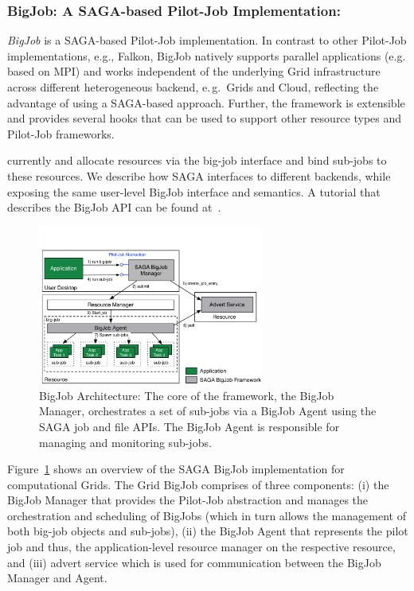     \subsubsection{BigJob: A SAGA-based Pilot-Job Implementation:}

    \emph{BigJob} is a SAGA-based Pilot-Job implementation. In contrast
    to other Pilot-Job implementations, e.g., Falkon, BigJob natively
    supports parallel applications (e.g. based on MPI) and works
    independent of the underlying Grid infrastructure across different
    heterogeneous backend, e.\,g.\ Grids and Cloud, reflecting the
    advantage of using a SAGA-based approach. Further, the framework is
    extensible and provides several hooks that can be used to support
    other resource types and Pilot-Job frameworks.

    currently %
    and %
    allocate resources via the big-job interface and bind sub-jobs to
    these resources.  We describe how SAGA interfaces to different
    backends, while exposing the same user-level BigJob interface and
    semantics.  A tutorial that describes the BigJob API can be found
    at~\cite{bigjob_cloud_tutorial}.

\begin{figure}[ht]
    \centering
    \includegraphics[width=0.66\textwidth]{figures/bigjob}
    \caption{BigJob Architecture: The core of the framework, the
      BigJob Manager, orchestrates a set of sub-jobs via a BigJob
      Agent using the SAGA job and file APIs.  The BigJob Agent is
      responsible for managing and monitoring sub-jobs.\up}
   \label{fig:figures_bigjob}
\end{figure}

    \vspace{0.1in}
    Figure~\ref{fig:figures_bigjob} shows an overview of the SAGA BigJob
    implementation for computational Grids. The Grid BigJob comprises of
    three components: (i) the BigJob Manager that provides the Pilot-Job
    abstraction and manages the orchestration and scheduling of BigJobs
    (which in turn allows the management of both big-job objects and
    sub-jobs), (ii) the BigJob Agent that represents the pilot job and
    thus, the application-level resource manager on the respective
    resource, and (iii) advert service which is used for communication
    between the BigJob Manager and Agent.


